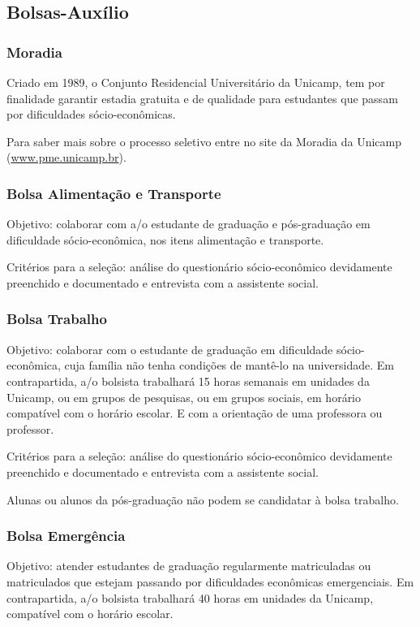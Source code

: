 \subsection{Bolsas-Auxílio}
\subsubsection{Moradia}

Criado em 1989, o Conjunto Residencial Universitário da Unicamp, tem por
finalidade garantir estadia gratuita e de qualidade para estudantes que passam
por dificuldades sócio-econômicas.

Para saber mais sobre o processo seletivo entre no site da Moradia da Unicamp
(\url{www.pme.unicamp.br}).

\subsubsection{Bolsa Alimentação e Transporte}

Objetivo: colaborar com a/o estudante de graduação e pós-graduação em
dificuldade só\-cio-\-e\-co\-nô\-mi\-ca, nos itens alimentação e transporte.

Critérios para a seleção: análise do questionário só\-cio-\-e\-co\-nô\-mi\-co
devidamente preenchido e documentado e entrevista com a assistente social.

\subsubsection{Bolsa Trabalho}

Objetivo: colaborar com o estudante de graduação em dificuldade
sócio-econômica, cuja família não tenha condições de mantê-lo na universidade.
Em contrapartida, a/o bolsista trabalhará 15 horas semanais em unidades da
Unicamp, ou em grupos de pesquisas, ou em grupos sociais, em horário compatível
com o horário escolar. E com a orientação de uma professora ou professor.

Critérios para a seleção: análise do questionário sócio-econômico devidamente
preenchido e documentado e entrevista com a assistente social.

Alunas ou alunos da pós-graduação não podem se candidatar à bolsa trabalho.

\subsubsection{Bolsa Emergência}

Objetivo: atender estudantes de graduação regularmente matriculadas ou
matriculados que estejam passando por dificuldades econômicas emergenciais. Em
contrapartida, a/o bolsista trabalhará 40 horas em unidades da Unicamp,
compatível com o horário escolar.

